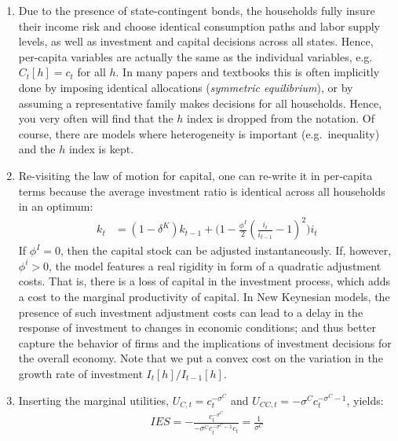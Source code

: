 \begin{enumerate}
\item
Due to the presence of state-contingent bonds, the households fully insure their income risk
  and choose identical consumption paths and labor supply levels,
  as well as investment and capital decisions across all states.
Hence, per-capita variables are actually the same as the individual variables, e.g.\
  \(C_{t}[h] = c_{t}\) for all \(h\).
In many papers and textbooks this is often implicitly done by imposing identical allocations (\emph{symmetric equilibrium}),
  or by assuming a representative family makes decisions for all households.
Hence, you very often will find that the \(h\) index is dropped from the notation.
Of course, there are models where heterogeneity is important (e.g.\ inequality) and the \(h\) index is kept.

\item
Re-visiting the law of motion for capital, one can re-write it in per-capita terms
  because the average investment ratio is identical across all households in an optimum:
\begin{align*}
k_{t} &= (1-\delta^{K}) k_{t-1} + \Biggl( 1 - \frac{\phi^{I}}{2} {\left(\frac{i_{t}}{i_{t-1}} - 1 \right)}^2 \Biggr) i_{t}
\end{align*}
If \(\phi^{I}=0\), then the capital stock can be adjusted instantaneously.
If, however, \(\phi^{i}>0\), the model features a real rigidity in form of a quadratic adjustment costs.
That is, there is a loss of capital in the investment process,
  which adds a cost to the marginal productivity of capital.
In New Keynesian models, the presence of such investment adjustment costs can lead to a delay in the response of investment to changes in economic conditions;
  and thus better capture the behavior of firms and the implications of investment decisions for the overall economy.
Note that we put a convex cost on the variation in the growth rate of investment \(I_{t}[h]/I_{t-1}[h]\).

\item
Inserting the marginal utilities, \(U_{C,t} = c_{t}^{-\sigma^{C}}\) and \(U_{CC,t} = - \sigma^{C} c_{t}^{-\sigma^{C}-1}\), yields:
\begin{align*}
{IES} = -\frac{c_{t}^{-\sigma^{C}}}{-\sigma^{C} c_{t}^{-\sigma^{C}-1} c_t} = \frac{1}{\sigma^{C}}
\end{align*}


\end{enumerate}
